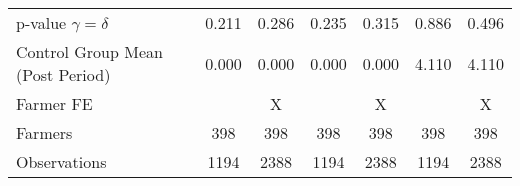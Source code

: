 {\begin{longtable}{l*{6}{c}}
p-value $\gamma=\delta$&    0.211         &    0.286         &    0.235         &    0.315         &    0.886         &    0.496         \\
Control Group Mean (Post Period)&    0.000         &    0.000         &    0.000         &    0.000         &    4.110         &    4.110         \\
Farmer FE       &                  &        X         &                  &        X         &                  &        X         \\
Farmers         &      398         &      398         &      398         &      398         &      398         &      398         \\
Observations    &     1194         &     2388         &     1194         &     2388         &     1194         &     2388         \\
\hline\hline
\end{longtable}
}
